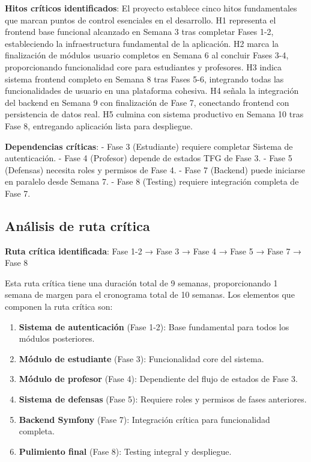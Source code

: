 \documentclass[12pt,a4paper,oneside]{report}
\providecommand{\tightlist}{%
  \setlength{\itemsep}{0pt}\setlength{\parskip}{0pt}}
\begin{document}
\textbf{Hitos críticos identificados}: El proyecto establece cinco hitos fundamentales que marcan puntos de control esenciales en el desarrollo. H1 representa el frontend base funcional alcanzado en Semana 3 tras completar Fases 1-2, estableciendo la infraestructura fundamental de la aplicación. H2 marca la finalización de módulos usuario completos en Semana 6 al concluir Fases 3-4, proporcionando funcionalidad core para estudiantes y profesores. H3 indica sistema frontend completo en Semana 8 tras Fases 5-6, integrando todas las funcionalidades de usuario en una plataforma cohesiva. H4 señala la integración del backend en Semana 9 con finalización de Fase 7, conectando frontend con persistencia de datos real. H5 culmina con sistema productivo en Semana 10 tras Fase 8, entregando aplicación lista para despliegue.

\textbf{Dependencias críticas}: - Fase 3 (Estudiante) requiere completar
Sistema de autenticación. - Fase 4 (Profesor) depende de estados TFG de
Fase 3. - Fase 5 (Defensas) necesita roles y permisos de Fase 4. - Fase
7 (Backend) puede iniciarse en paralelo desde Semana 7. - Fase 8
(Testing) requiere integración completa de Fase 7.

\subsection{Análisis de ruta
crítica}\label{anuxe1lisis-de-ruta-cruxedtica}

\textbf{Ruta crítica identificada}: Fase 1-2 → Fase 3 → Fase 4 → Fase 5
→ Fase 7 → Fase 8

Esta ruta crítica tiene una duración total de 9 semanas, proporcionando
1 semana de margen para el cronograma total de 10 semanas. Los elementos
que componen la ruta crítica son:

\begin{enumerate}
\def\labelenumi{\arabic{enumi}.}
\tightlist
\item
  \textbf{Sistema de autenticación} (Fase 1-2): Base fundamental para
  todos los módulos posteriores.
\item
  \textbf{Módulo de estudiante} (Fase 3): Funcionalidad core del
  sistema.
\item
  \textbf{Módulo de profesor} (Fase 4): Dependiente del flujo de estados
  de Fase 3.
\item
  \textbf{Sistema de defensas} (Fase 5): Requiere roles y permisos de
  fases anteriores.
\item
  \textbf{Backend Symfony} (Fase 7): Integración crítica para
  funcionalidad completa.
\item
  \textbf{Pulimiento final} (Fase 8): Testing integral y despliegue.
\end{enumerate}
\end{document}
